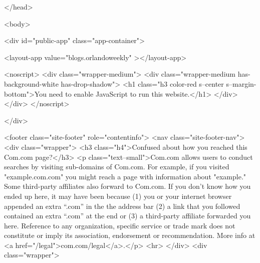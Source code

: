 </head>

<body>

<div id="public-app" class="app-container">

        
        <layout-app
        value="blogs.orlandoweekly"
    ></layout-app>


        <noscript>
            <div class="wrapper-medium">
                <div class="wrapper-medium has-background-white has-drop-shadow">
                    <h1 class="h3 color-red s--center s--margin-bottom">You need to enable JavaScript to run this website.</h1>
                </div>
            </div>
        </noscript>

    </div>

    
        <footer class="site-footer" role="contentinfo">
    <nav class="site-footer-nav">
                    <div class="wrapper">
                <h3 class="h4">Confused about how you reached this Com.com page?</h3>
                <p class="text--small">Com.com allows users to conduct searches by visiting sub-domains of Com.com. For example, if you visited "example.com.com" you might reach a page with information about "example." Some third-party affiliates also forward to Com.com. If you don't know how you ended up here, it may have been because (1) you or your internet browser appended an extra “.com” in the the address bar (2) a link that you followed contained an extra “.com” at the end or (3) a third-party affiliate forwarded you here. Reference to any organization, specific service or trade mark does not constitute or imply its association, endorsement or recommendation. More info at <a href="/legal">com.com/legal</a>.</p>
                <hr>
            </div>
                <div class="wrapper">

